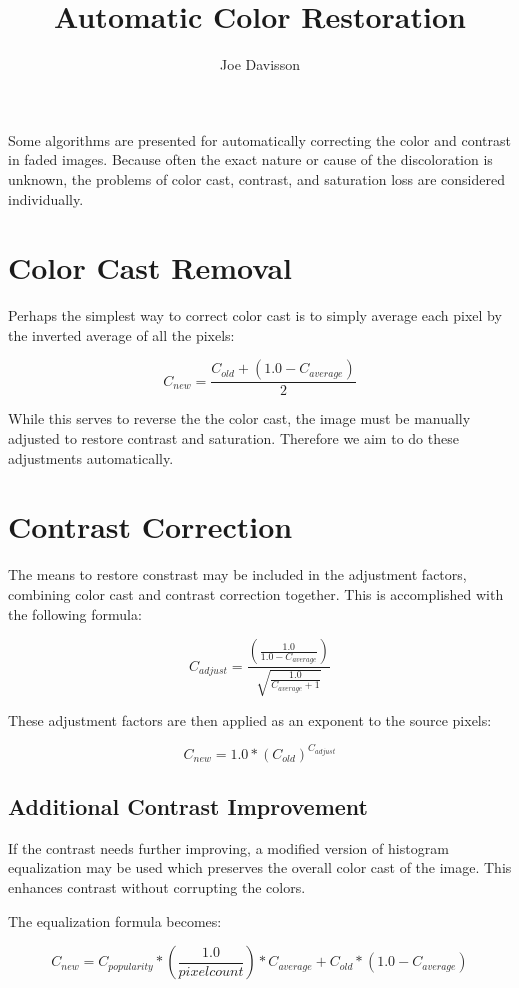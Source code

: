 \documentclass{article}
\title{Automatic Color Restoration}
\author{Joe Davisson} %
\begin{document}
\maketitle

Some algorithms are presented for automatically correcting the
color and contrast in faded images. Because often the exact nature or cause
of the discoloration is unknown, the problems of color cast, contrast, and
saturation loss are considered individually.

\section{Color Cast Removal}
Perhaps the simplest way to correct color cast is to simply average each
pixel by the inverted average of all the pixels:

\[ C_{new} = \frac{C_{old} + \left(1.0 - C_{average}\right) }{2} \]

While this serves to reverse the the color cast, the image must be manually
adjusted to restore contrast and saturation. Therefore we aim to do these
adjustments automatically.

\section{Contrast Correction}
The means to restore constrast may be included in the adjustment factors,
combining color cast and contrast correction together. This is accomplished
with the following formula:

\[ C_{adjust} = \frac{\left(\frac{1.0} {1.0 - C_{average}}\right)}
                     {\sqrt{\frac{1.0} { C_{average} + 1}}} \]

These adjustment factors are then applied as an exponent to the source pixels:

\[ C_{new} = 1.0 * \left(C_{old}\right) ^ {C_{adjust}} \]

\subsection{Additional Contrast Improvement}
If the contrast needs further improving, a modified version of histogram
equalization may be used which preserves the overall color cast of the image.
This enhances contrast without corrupting the colors.

The equalization formula becomes:

\[ C_{new} = C_{popularity} * \left(\frac{1.0}{pixel count}\right) * C_{average}
                   + C_{old} * \left(1.0 - C_{average}\right) \]
\end{document}
